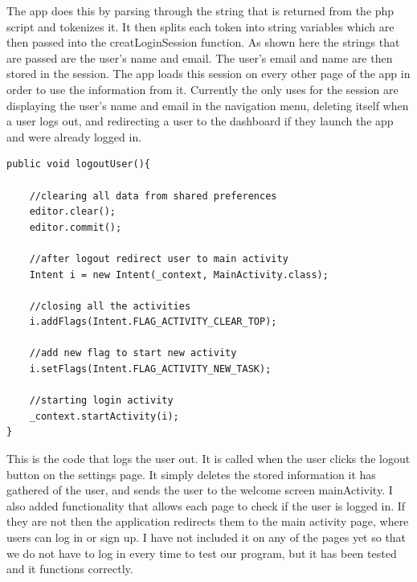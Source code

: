 \documentclass[onecolumn, draftclsnofoot,10pt, compsoc]{IEEEtran}
\begin{document}
		The app does this by parsing through the string that is returned from the php script and tokenizes it. It then splits each token into string variables which are then passed into the creatLoginSession function. As shown here the strings that are passed are the user’s name and email. The user’s email and name are then stored in the session. The app loads this session on every other page of the app in order to use the information from it. Currently the only uses for the session are displaying the user’s name and email in the navigation menu,  deleting itself when a user logs out, and redirecting a user to the dashboard if they launch the app and were already logged in.
		\newpage

		\begin{lstlisting}[style=java]
public void logoutUser(){

	//clearing all data from shared preferences
	editor.clear();
	editor.commit();

	//after logout redirect user to main activity
	Intent i = new Intent(_context, MainActivity.class);

	//closing all the activities
	i.addFlags(Intent.FLAG_ACTIVITY_CLEAR_TOP);

	//add new flag to start new activity
	i.setFlags(Intent.FLAG_ACTIVITY_NEW_TASK);

	//starting login activity
	_context.startActivity(i);
}
		\end{lstlisting}

		This is the code that logs the user out. It is called when the user clicks the logout button on the settings page. It simply deletes the stored information it has gathered of the user, and sends the user to the welcome screen mainActivity. I also added functionality that allows each page to check if the user is logged in. If they are not then the application redirects them to the main activity page, where users can log in or sign up. I have not included it on any of the pages yet so that we do not have to log in every time to test our program, but it has been tested and it functions correctly.
\end{document}
